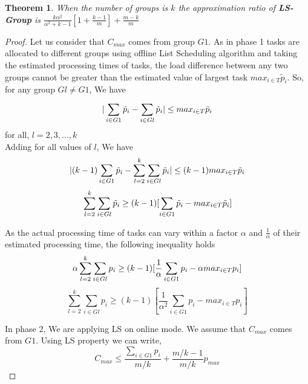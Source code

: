 \documentclass[10pt, conference, compsocconf]{IEEEtran}
\newtheorem{theorem}{Theorem}[section]
\begin{document}
\begin{theorem}
When the number of groups is $k$ the approximation ratio of \textbf{LS-Group } is $  \frac{k\alpha^{2}}{\alpha^{2}+k-1}[1+ {\frac{k-1}{m}} ]+ {\frac{m-k}{m}}   $ 
\end{theorem}
\begin{proof} 
Let us consider  that $ C_{max}$ comes from group $G1$.  As in phase 1 tasks are allocated to different groups using offline List Scheduling algorithm and taking the estimated processing times of tasks, the load difference between any two groups cannot be greater than the estimated value of largest task ${max_{i \in T}}{\tilde p_{i}}$.  So, for any group $Gl \neq G1$, We have
\begin{equation}{\nonumber}
|\sum_{i \in G1 }^{}{\tilde p_{i}}- \sum_{i \in Gl }^{}{\tilde p_{i}}| \leq {max_{i \in T}}{\tilde p_{i}}\end{equation}  \hspace*{15pt}   for all, $l = 2,3,...,k$ \\ 
Adding for all values of $l$, We have 
\begin{equation}{\nonumber}
|(k-1)\sum_{i \in G1 }^{}{\tilde p_{i}}- \sum_{l=2}^{k}\sum_{i \in Gl }^{}{\tilde p_{i}}| \leq (k-1) {max_{i \in T}}{\tilde p_{i}}
\end{equation}
\begin{equation}{\nonumber}
 \sum_{l=2}^{k}\sum_{i \in Gl }^{}{\tilde p_{i}} \geq (k-1)[\sum_{i \in G1 }^{}{\tilde p_{i}}- {max_{i \in T}}{\tilde p_{i}}]
\end{equation}

As the actual processing time of tasks  can vary within a factor $\alpha$ and $\frac{1}{\alpha}$ of their estimated processing time, the following inequality holds
\begin{equation}{\nonumber}
 \alpha\sum_{l=2}^{k}\sum_{i \in Gl }^{}{{p_{i}}} \geq (k-1)[\frac{1}{\alpha}\sum_{i \in G1 }^{}{{p_{i}}}- \alpha {max_{i \in T}}{{p_{i}}}]
\end{equation}
\begin{equation}
\sum_{l=2}^{k}\sum_{i \in Gl }^{}{{p_{i}}} \geq (k-1)[\frac{1}{\alpha^{2}}\sum_{i \in G1 }^{}{{p_{i}}}-  {max_{i \in T}}{{p_{i}}}]
\end{equation}

In phase 2, We are applying LS on online mode. We assume that $C_{max}$ comes from $G1$. Using LS property we can write,
\begin{equation}
 C_{max} \leq \frac{\sum_{i \in G1 }^{}{{p_{i}}}}{m/k} + {\frac{m/k-1}{m/k}} p_{max}
\end{equation}


\end{proof}
\end{document}
